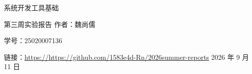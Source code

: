 \documentclass[12pt, a4paper]{article}
\newcommand{\myname}{魏尚儒}
\newcommand{\myid}{25020007136}
\newcommand{\mygithub}{https://https://github.com/1583e4d-Rn/2026summer-reports}
\begin{document}
\begin{titlepage}
    \centering
    \thispagestyle{empty}
    {\Huge 系统开发工具基础}
    \par
    \vspace{1em}
    {\Large 第三周实验报告}
    \vfill
    {\large 作者：\myname}
    \par
    {\large 学号：\myid}
    \par
    {\large 链接：\url{\mygithub}}
    {\large 2026 年 9 月 11 日}

\end{titlepage}


\tableofcontents
\thispagestyle{empty}
\newpage




\end{document}
